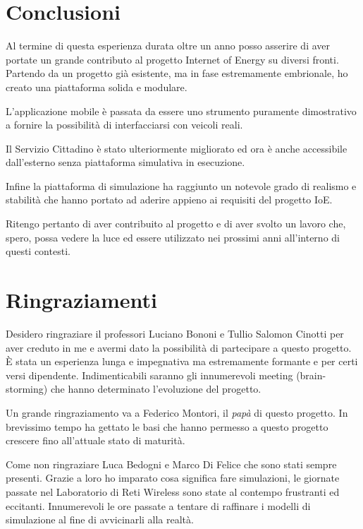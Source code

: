 \chapter{Conclusioni}

Al termine di questa esperienza durata oltre un anno posso asserire di aver portate un grande contributo al progetto Internet of Energy su diversi fronti. Partendo da un progetto già esistente, ma in fase estremamente embrionale, ho creato una piattaforma solida e modulare. 

L'applicazione mobile è passata da essere uno strumento puramente dimostrativo a fornire la possibilità di interfacciarsi con veicoli reali.

Il Servizio Cittadino è stato ulteriormente migliorato ed ora è anche accessibile dall'esterno senza piattaforma simulativa in esecuzione.

Infine la piattaforma di simulazione ha raggiunto un notevole grado di realismo e stabilità che hanno portato ad aderire appieno ai requisiti del progetto IoE. 

Ritengo pertanto di aver contribuito al progetto e di aver svolto un lavoro che, spero, possa vedere la luce ed essere utilizzato nei prossimi anni all'interno di questi contesti.


\chapter{Ringraziamenti}

Desidero ringraziare il professori Luciano Bononi e Tullio Salomon Cinotti per aver creduto in me e avermi dato la possibilità di partecipare a questo progetto. È stata un esperienza lunga e impegnativa ma estremamente formante e per certi versi dipendente. Indimenticabili saranno gli innumerevoli meeting (brain-storming) che hanno determinato l'evoluzione del progetto.

Un grande ringraziamento va a Federico Montori, il \emph{papà} di questo progetto. In brevissimo tempo ha gettato le basi che hanno permesso a questo progetto crescere fino all'attuale stato di maturità.

Come non ringraziare Luca Bedogni e Marco Di Felice che sono stati sempre presenti. Grazie a loro ho imparato cosa significa fare simulazioni, le giornate passate nel Laboratorio di Reti Wireless sono state al contempo frustranti ed eccitanti. Innumerevoli le ore passate a tentare di raffinare i modelli di simulazione al fine di avvicinarli alla realtà.

